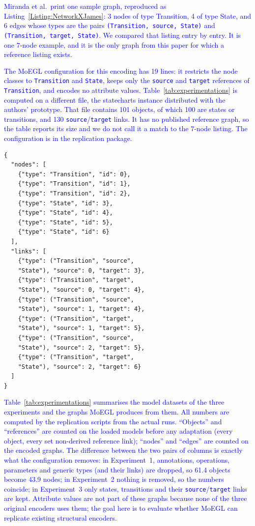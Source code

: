 \documentclass[journal,article,submit,moreauthors,technologies]{Definitions/mdpi}
\newcommand{\rev}[1]{\textcolor{blue}{#1}}
\begin{document}
\rev{Miranda et al.\ print one sample graph, reproduced as Listing~\ref{Listing:NetworkXJames}: 3 nodes of type Transition, 4 of type State, and 6 edges whose types are the pairs \texttt{(Transition, source, State)} and \texttt{(Transition, target, State)}. We compared that listing entry by entry. It is one 7-node example, and it is the only graph from this paper for which a reference listing exists.}

\rev{The MoEGL configuration for this encoding has 19 lines: it restricts the node classes to \texttt{Transition} and \texttt{State}, keeps only the \texttt{source} and \texttt{target} references of \texttt{Transition}, and encodes no attribute values. Table~\ref{tab:experimentations} is computed on a different file, the statecharts instance distributed with the authors' prototype. That file contains 101 objects, of which 100 are states or transitions, and 130 \texttt{source}/\texttt{target} links. It has no published reference graph, so the table reports its size and we do not call it a match to the 7-node listing. The configuration is in the replication package.}


\begin{program_}[H]
\footnotesize
\begin{verbatim}
{
  "nodes": [
    {"type": "Transition", "id": 0},
    {"type": "Transition", "id": 1},
    {"type": "Transition", "id": 2},
    {"type": "State", "id": 3},
    {"type": "State", "id": 4},
    {"type": "State", "id": 5},
    {"type": "State", "id": 6}
  ],
  "links": [
    {"type": ("Transition", "source",
    "State"), "source": 0, "target": 3},
    {"type": ("Transition", "target",
    "State"), "source": 0, "target": 4},
    {"type": ("Transition", "source",
    "State"), "source": 1, "target": 4},
    {"type": ("Transition", "target",
    "State"), "source": 1, "target": 5},
    {"type": ("Transition", "source",
    "State"), "source": 2, "target": 5},
    {"type": ("Transition", "target",
    "State"), "source": 2, "target": 6}
  ]
}
\end{verbatim}
\caption{The graph data of the FSM instance model in~\cite{miranda2024towards}.}
\label{Listing:NetworkXJames}
\end{program_}



\rev{Table~\ref{tab:experimentations} summarises the model datasets of the three experiments and the graphs MoEGL produces from them. All numbers are computed by the replication scripts from the actual runs. ``Objects'' and ``references'' are counted on the loaded models before any adaptation (every object, every set non-derived reference link); ``nodes'' and ``edges'' are counted on the encoded graphs. The difference between the two pairs of columns is exactly what the configuration removes: in Experiment~1, annotations, operations, parameters and generic types (and their links) are dropped, so 61.4 objects become 43.9 nodes; in Experiment~2 nothing is removed, so the numbers coincide; in Experiment~3 only states, transitions and their \texttt{source}/\texttt{target} links are kept. Attribute values are not part of these graphs because none of the three original encoders uses them; the goal here is to evaluate whether MoEGL can replicate existing structural encoders.}
\end{document}
